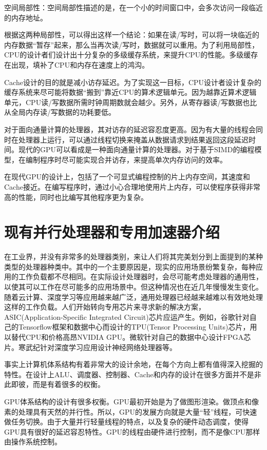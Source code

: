 空间局部性：空间局部性描述的是，在一个小的时间窗口中，会多次访问一段临近的内存地址。

根据这两种局部性，可以得出这样一个结论：如果在读/写时，可以将一块临近的内存数据“暂存”起来，那么当再次读/写时，数据就可以重用。为了利用局部性，CPU的设计者们设计出十分复杂的多级缓存系统，来提升CPU的性能。多级缓存在出现，填补了CPU和内存在速度上的鸿沟。

Cache设计的目的就是减小访存延迟。为了实现这一目标，CPU设计者设计复杂的缓存系统来尽可能将数据“搬到”靠近CPU的算术逻辑单元。因为越靠近算术逻辑单元，CPU读/写数据所需时钟周期数就会越少。另外，从寄存器读/写数据也比从全局内存读/写数据的功耗要低。

对于面向通量计算的处理器，其对访存的延迟容忍度更高。因为有大量的线程会同时在处理器上运行，可以通过线程切换来掩盖从数据请求到结果返回这段延迟时间。现代的GPU可以看成是一种面向通量计算的处理器。对于基于SIMD的编程模型，在编制程序时尽可能实现合并访存，来提高单次内存访问的效率。

在现代GPU的设计上，包括了一个可显式编程控制的片上内存空间，其速度和Cache接近。在编写程序时，通过小心合理地使用片上内存，可以使程序获得非常高的性能，同时也比编写其他程序更为复杂。



\section{现有并行处理器和专用加速器介绍}
在工业界，并没有非常多的处理器类别，来让人们将其完美划分到上面提到的某种类型的处理器种类中。其中的一个主要原因是，现实的应用场景纷繁复杂，每种应用的工作负载都不尽相同。在实际设计处理器时，会尽可能考虑处理器的通用性，以使其可以工作在尽可能多的应用场景中。但这种情况也在近几年慢慢发生变化。随着云计算、深度学习等应用越来越广泛，通用处理器已经越来越难以有效地处理这样的工作负载。人们开始转向专用芯片来寻求新的解决方案，ASIC(Application-Specific Integrated Circuit)芯片应运产生。例如，谷歌针对自己的Tensorflow框架和数据中心而设计的TPU(Tensor Processing Units)芯片，用以替代CPU和价格高昂NVIDIA GPU。微软针对自己的数据中心设计FPGA芯片。寒武纪针对深度学习应用设计神经网络处理器等。

事实上计算机体系结构有着非常大的设计余地，在每个方向上都有值得深入挖掘的特性。在设计上ALU、调度器、控制器、Cache和内存的设计在很多方面并不是非此即彼，而是有着很多的权衡。

GPU体系结构的设计有很多权衡。GPU最初开始是为了做图形渲染。做顶点和像素的处理具有天然的并行性。所以，GPU的发展方向就是大量“轻”线程，可快速做任务切换。由于大量并行轻量线程的特点，以及复杂的硬件动态调度，使得GPU具有很好的延迟容忍特性。GPU的线程由硬件进行控制，而不是像CPU那样由操作系统控制。

